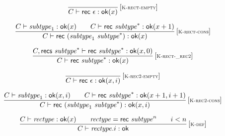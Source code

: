 \vspace{1ex}

$$
\begin{array}{@{}c@{}}\displaystyle
\frac{
}{
C \vdash \mathsf{rec}~\epsilon : {\mathsf{ok}}{(x)}
} \, {[\textsc{\scriptsize K{-}rect{-}empty}]}
\qquad
\end{array}
$$

$$
\begin{array}{@{}c@{}}\displaystyle
\frac{
C \vdash {\mathit{subtype}}_1 : {\mathsf{ok}}{(x)}
 \qquad
C \vdash \mathsf{rec}~{{\mathit{subtype}}^\ast} : {\mathsf{ok}}{(x + 1)}
}{
C \vdash \mathsf{rec}~({\mathit{subtype}}_1~{{\mathit{subtype}}^\ast}) : {\mathsf{ok}}{(x)}
} \, {[\textsc{\scriptsize K{-}rect{-}cons}]}
\qquad
\end{array}
$$

$$
\begin{array}{@{}c@{}}\displaystyle
\frac{
C, \mathsf{recs}~{{\mathit{subtype}}^\ast} \vdash \mathsf{rec}~{{\mathit{subtype}}^\ast} : {\mathsf{ok}}{(x, 0)}
}{
C \vdash \mathsf{rec}~{{\mathit{subtype}}^\ast} : {\mathsf{ok}}{(x)}
} \, {[\textsc{\scriptsize K{-}rect{-}\_rec2}]}
\qquad
\end{array}
$$

$$
\begin{array}{@{}c@{}}\displaystyle
\frac{
}{
C \vdash \mathsf{rec}~\epsilon : {\mathsf{ok}}{(x, i)}
} \, {[\textsc{\scriptsize K{-}rec2{-}empty}]}
\qquad
\end{array}
$$

$$
\begin{array}{@{}c@{}}\displaystyle
\frac{
C \vdash {\mathit{subtype}}_1 : {\mathsf{ok}}{(x, i)}
 \qquad
C \vdash \mathsf{rec}~{{\mathit{subtype}}^\ast} : {\mathsf{ok}}{(x + 1, i + 1)}
}{
C \vdash \mathsf{rec}~({\mathit{subtype}}_1~{{\mathit{subtype}}^\ast}) : {\mathsf{ok}}{(x, i)}
} \, {[\textsc{\scriptsize K{-}rec2{-}cons}]}
\qquad
\end{array}
$$

\vspace{1ex}

$$
\begin{array}{@{}c@{}}\displaystyle
\frac{
C \vdash {\mathit{rectype}} : {\mathsf{ok}}{(x)}
 \qquad
{\mathit{rectype}} = \mathsf{rec}~{{\mathit{subtype}}^{n}}
 \qquad
i < n
}{
C \vdash {\mathit{rectype}} {.} i : \mathsf{ok}
} \, {[\textsc{\scriptsize K{-}def}]}
\qquad
\end{array}
$$

\vspace{1ex}

